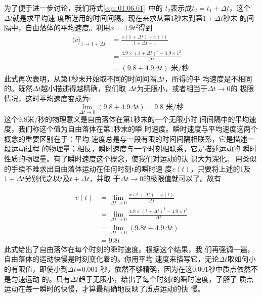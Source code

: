为了便于进一步讨论，我们将式\ref{eqn:01.06.01}~中的
$t_2$表示成$t_2=t_1+\Delta t$，这个$\Delta t$就是求平均速
度所选用的时间间隔。现在来求从第1秒末到第$1+\Delta t$秒末
的间隔中，自由落体的平均速度。利用$x=4.9t^2$得到
\begin{equation*}
    \begin{aligned}
        \langle v\rangle_{1 \rightarrow 1+\Delta t} & =\frac{x\left(1+\Delta t\right)-x\left(1\right)}{1+\Delta t-1}                      \\
                                                    & =\frac{4.9 \times\left(1+\Delta t\right)^{2}-4.9 \times 1^{2}}{\Delta t} \\
                                                    & =\left(9.8+4.9 \Delta t\right) \text { 米/秒 }
    \end{aligned}
\end{equation*}
此式再次表明，从第1秒末开始取不同的时间间隔$\Delta t$，所得的平
均速度是不相同的。既然$\Delta t$越小描述得越精确，我们取
$\Delta t$为无限小，或者相当于$\Delta t \rightarrow 0$的
极限情况，这时平均速度变成为:
\begin{equation*}
    \lim _{\Delta t \rightarrow 0}\left(9.8+4.9 \Delta t\right)=9.8 \text { 米/秒 }
\end{equation*}
这个9.8米/秒的物理意义是自由落体在第1秒末的一个无限小时
间间隔中的平均速度，我们称这个值为自由落体在第1秒末的瞬
时速度。瞬时速度与平均速度这两个概念的重要区别在于：平均
速度总是与一段有限的时间间隔相联系，它是描述一段运动过程
的物理量；相反，瞬时速度与一个时刻相联系，它是描述运动的
瞬时性质的物理量。有了瞬时速度这个概念，使我们对运动的认
识大为深化。
用类似的手续不难求出自由落体运动在任何时刻t的瞬时速
度$v\left(t\right)$，只要将上述的1及$1+\Delta t$分别代之以$t$及$t+\Delta t$，并取
于$\Delta t \rightarrow 0$的极限值就可以了。故有

\begin{equation}\label{eqn:01.06.02}
    \begin{aligned}
        v\left(t\right) & =\lim _{\Delta t \rightarrow 0} \frac{x\left(t+\Delta t\right)-x\left(t\right)}{\Delta t}                          \\
             & =\lim _{\Delta t \rightarrow 0} \frac{4.9 \times\left(t+\Delta t\right)^{2}-4.9 \times t^{2}}{\Delta t} \\
             & =\lim _{\Delta t \rightarrow 0}\left(9.8 t+4.9 \Delta t\right)                                          \\
             & =9.8 t
    \end{aligned}
\end{equation}
此式给出了自由落体在每个时刻的瞬时速度。根据这个结果，我
们再强调一遍，自由落体的运动快慢是时刻变化着的。你用平均
速度来描写它，无论$\Delta t$取如何小的有限值，即使小到$\Delta t$=0.001
秒，依然不够精确，因为在这0.001秒中质点依然不是匀速运动
的。只有$\Delta t$趋于无限小，给出了每个时刻$t$的瞬时速度，了解了
质点运动在每一瞬时的快慢，才算最精确地反映了质点运动的快
慢。

